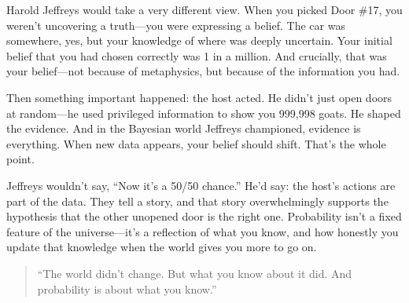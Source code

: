 Harold Jeffreys would take a very different view. When you picked Door \#17, you weren’t uncovering a truth—you were expressing a belief. The car was somewhere, yes, but your knowledge of where was deeply uncertain. Your initial belief that you had chosen correctly was 1 in a million. And crucially, that was your belief—not because of metaphysics, but because of the information you had.

Then something important happened: the host acted. He didn’t just open doors at random—he used privileged information to show you 999,998 goats. He shaped the evidence. And in the Bayesian world Jeffreys championed, evidence is everything. When new data appears, your belief should shift. That’s the whole point.

Jeffreys wouldn’t say, “Now it’s a 50/50 chance.” He’d say: the host’s actions are part of the data. They tell a story, and that story overwhelmingly supports the hypothesis that the other unopened door is the right one. Probability isn’t a fixed feature of the universe—it’s a reflection of what you know, and how honestly you update that knowledge when the world gives you more to go on.

\begin{quote}
``The world didn’t change. But what you know about it did. And probability is about what you know.''
\end{quote}



